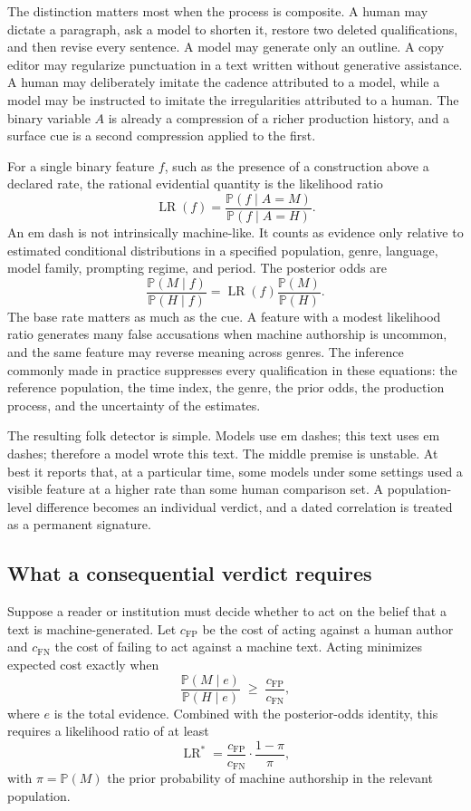 \documentclass[11pt]{article}
\theoremstyle{plain}
\theoremstyle{definition}
\theoremstyle{remark}
\newcommand{\Pp}{\mathbb{P}}
\newcommand{\LR}{\operatorname{LR}}
\begin{document}
The distinction matters most when the process is composite. A human may dictate a paragraph, ask a model to shorten it, restore two deleted qualifications, and then revise every sentence. A model may generate only an outline. A copy editor may regularize punctuation in a text written without generative assistance. A human may deliberately imitate the cadence attributed to a model, while a model may be instructed to imitate the irregularities attributed to a human. The binary variable $A$ is already a compression of a richer production history, and a surface cue is a second compression applied to the first.

For a single binary feature $f$, such as the presence of a construction above a declared rate, the rational evidential quantity is the likelihood ratio
\[
\LR(f)
=
\frac{\Pp(f\mid A=M)}{\Pp(f\mid A=H)}.
\]
An em dash is not intrinsically machine-like. It counts as evidence only relative to estimated conditional distributions in a specified population, genre, language, model family, prompting regime, and period. The posterior odds are
\[
\frac{\Pp(M\mid f)}{\Pp(H\mid f)}
=
\LR(f)
\frac{\Pp(M)}{\Pp(H)}.
\]
The base rate matters as much as the cue. A feature with a modest likelihood ratio generates many false accusations when machine authorship is uncommon, and the same feature may reverse meaning across genres. The inference commonly made in practice suppresses every qualification in these equations: the reference population, the time index, the genre, the prior odds, the production process, and the uncertainty of the estimates.

The resulting folk detector is simple. Models use em dashes; this text uses em dashes; therefore a model wrote this text. The middle premise is unstable. At best it reports that, at a particular time, some models under some settings used a visible feature at a higher rate than some human comparison set. A population-level difference becomes an individual verdict, and a dated correlation is treated as a permanent signature.

\subsection{What a consequential verdict requires}\label{sec:threshold}

Suppose a reader or institution must decide whether to act on the belief that a text is machine-generated. Let $c_{\mathrm{FP}}$ be the cost of acting against a human author and $c_{\mathrm{FN}}$ the cost of failing to act against a machine text. Acting minimizes expected cost exactly when
\[
\frac{\Pp(M\mid e)}{\Pp(H\mid e)} \;\ge\; \frac{c_{\mathrm{FP}}}{c_{\mathrm{FN}}},
\]
where $e$ is the total evidence. Combined with the posterior-odds identity, this requires a likelihood ratio of at least
\[
\LR^\ast
=
\frac{c_{\mathrm{FP}}}{c_{\mathrm{FN}}}\cdot\frac{1-\pi}{\pi},
\]
with $\pi=\Pp(M)$ the prior probability of machine authorship in the relevant population.
\end{document}
